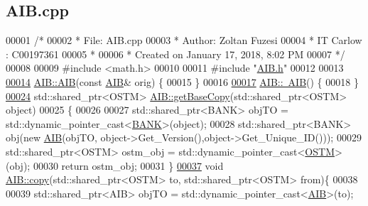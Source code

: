 \hypertarget{_a_i_b_8cpp_source}{}\subsection{A\+I\+B.\+cpp}

\begin{DoxyCode}
00001 \textcolor{comment}{/* }
00002 \textcolor{comment}{ * File:   AIB.cpp}
00003 \textcolor{comment}{ * Author: Zoltan Fuzesi}
00004 \textcolor{comment}{ * IT Carlow : C00197361}
00005 \textcolor{comment}{ *}
00006 \textcolor{comment}{ * Created on January 17, 2018, 8:02 PM}
00007 \textcolor{comment}{ */}
00008 
00009 \textcolor{preprocessor}{#include <math.h>}
00010 
00011 \textcolor{preprocessor}{#include "\hyperlink{_a_i_b_8h}{AIB.h}"}
00012 
00013 
\hypertarget{_a_i_b_8cpp_source.tex_l00014}{}\hyperlink{class_a_i_b_ab13d0db3498d59dbe6a946c469587c55_ab13d0db3498d59dbe6a946c469587c55}{00014} \hyperlink{class_a_i_b_a4783110463bf12f937a85b62455faf38_a4783110463bf12f937a85b62455faf38}{AIB::AIB}(\textcolor{keyword}{const} \hyperlink{class_a_i_b}{AIB}& orig) \{
00015 \}
00016 
\hypertarget{_a_i_b_8cpp_source.tex_l00017}{}\hyperlink{class_a_i_b_a22b11c50b0986326c86315957528bf79_a22b11c50b0986326c86315957528bf79}{00017} \hyperlink{class_a_i_b_a22b11c50b0986326c86315957528bf79_a22b11c50b0986326c86315957528bf79}{AIB::~AIB}() \{
00018 \}
\hypertarget{_a_i_b_8cpp_source.tex_l00024}{}\hyperlink{class_a_i_b_a987107f3d7a04790f84c1e7eeee37575_a987107f3d7a04790f84c1e7eeee37575}{00024} std::shared\_ptr<OSTM> \hyperlink{class_a_i_b_a987107f3d7a04790f84c1e7eeee37575_a987107f3d7a04790f84c1e7eeee37575}{AIB::getBaseCopy}(std::shared\_ptr<OSTM> \textcolor{keywordtype}{object})
00025 \{
00026 
00027     std::shared\_ptr<BANK> objTO = std::dynamic\_pointer\_cast<\hyperlink{class_b_a_n_k}{BANK}>(object);
00028     std::shared\_ptr<BANK> obj(\textcolor{keyword}{new} \hyperlink{class_a_i_b_a4783110463bf12f937a85b62455faf38_a4783110463bf12f937a85b62455faf38}{AIB}(objTO, object->Get\_Version(),\textcolor{keywordtype}{object}->Get\_Unique\_ID()));
00029     std::shared\_ptr<OSTM> ostm\_obj = std::dynamic\_pointer\_cast<\hyperlink{class_o_s_t_m}{OSTM}>(obj);
00030     \textcolor{keywordflow}{return} ostm\_obj;
00031 \}
\hypertarget{_a_i_b_8cpp_source.tex_l00037}{}\hyperlink{class_a_i_b_ad76f25ce86cb42028440f41c371903e0_ad76f25ce86cb42028440f41c371903e0}{00037} \textcolor{keywordtype}{void} \hyperlink{class_a_i_b_ad76f25ce86cb42028440f41c371903e0_ad76f25ce86cb42028440f41c371903e0}{AIB::copy}(std::shared\_ptr<OSTM> to, std::shared\_ptr<OSTM> from)\{
00038 
00039     std::shared\_ptr<AIB> objTO = std::dynamic\_pointer\_cast<\hyperlink{class_a_i_b}{AIB}>(to);

\end{DoxyCode}
